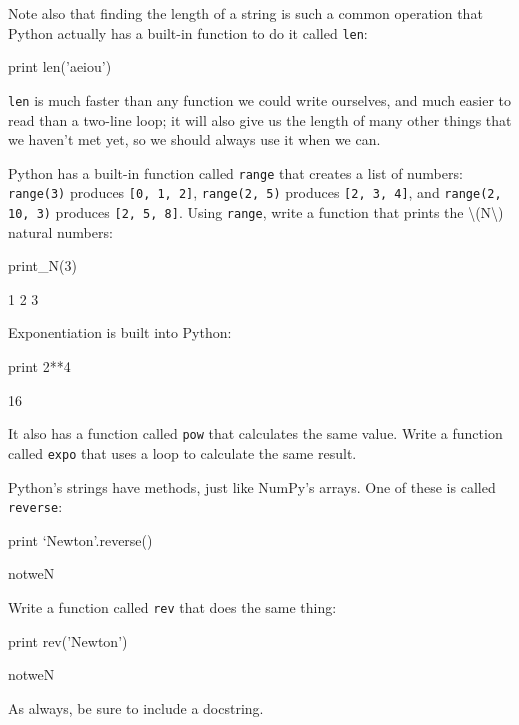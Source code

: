 \documentclass{book}
\begin{document}
Note also that finding the length of a string is such a common operation
that Python actually has a built-in function to do it called
\texttt{len}:

\begin{VerbIn}
print len('aeiou')
\end{VerbIn}

\texttt{len} is much faster than any function we could write ourselves,
and much easier to read than a two-line loop; it will also give us the
length of many other things that we haven't met yet, so we should always
use it when we can.

\begin{challenge}
  Python has a built-in function called \texttt{range} that creates a
  list of numbers: \texttt{range(3)} produces \texttt{{[}0, 1, 2{]}},
  \texttt{range(2, 5)} produces \texttt{{[}2, 3, 4{]}}, and
  \texttt{range(2, 10, 3)} produces \texttt{{[}2, 5, 8{]}}. Using
  \texttt{range}, write a function that prints the
  \textbackslash{}(N\textbackslash{}) natural numbers:
\begin{VerbIn}
print_N(3)
\end{VerbIn}

\begin{VerbOut}
1 2 3
\end{VerbOut}
\end{challenge}

\begin{challenge}
  Exponentiation is built into Python:
\begin{VerbIn}
print 2**4
\end{VerbIn}

\begin{VerbOut}
16
\end{VerbOut}
  It also has a function called
  \texttt{pow} that calculates the same value. Write a function called
  \texttt{expo} that uses a loop to calculate the same result.
\end{challenge}

\begin{challenge}
  Python's strings have methods, just like NumPy's arrays. One of these
  is called \texttt{reverse}:
\begin{VerbIn}
  print `Newton'.reverse()
\end{VerbIn}

\begin{VerbOut}
notweN
\end{VerbOut}
  Write a function called \texttt{rev} that does the same thing:
\begin{VerbIn}
print rev('Newton')
\end{VerbIn}

\begin{VerbOut}
notweN
\end{VerbOut}
  As always, be sure to include a
  docstring.
\end{challenge}
\end{document}
